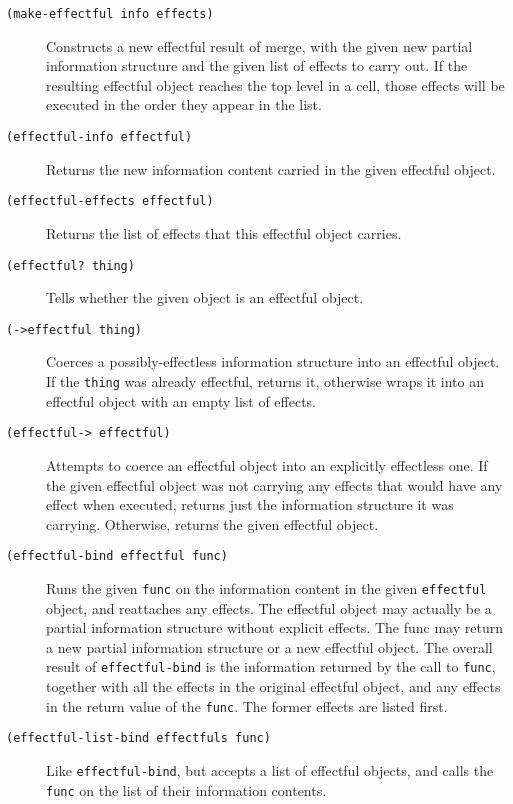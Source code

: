 \documentclass[12pt,letterpaper,english]{article}
\begin{document}
\begin{description}
\item[{\texttt{(make-effectful info effects)}}] \leavevmode 
Constructs a new effectful result of merge, with the given new
partial information structure and the given list of effects to carry
out.  If the resulting effectful object reaches the top level in a
cell, those effects will be executed in the order they appear in the
list.

\item[{\texttt{(effectful-info effectful)}}] \leavevmode 
Returns the new information content carried in the given
effectful object.

\item[{\texttt{(effectful-effects effectful)}}] \leavevmode 
Returns the list of effects that this effectful object carries.

\item[{\texttt{(effectful? thing)}}] \leavevmode 
Tells whether the given object is an effectful object.

\item[{\texttt{(->effectful thing)}}] \leavevmode 
Coerces a possibly-effectless information structure into an
effectful object.  If the \texttt{thing} was already effectful,
returns it, otherwise wraps it into an effectful object
with an empty list of effects.

\item[{\texttt{(effectful-> effectful)}}] \leavevmode 
Attempts to coerce an effectful object into an explicitly effectless
one.  If the given effectful object was not carrying any effects
that would have any effect when executed, returns just the
information structure it was carrying.  Otherwise, returns
the given effectful object.

\item[{\texttt{(effectful-bind effectful func)}}] \leavevmode 
Runs the given \texttt{func} on the information content in the given
\texttt{effectful} object, and reattaches any effects.  The effectful
object may actually be a partial information structure without
explicit effects.  The func may return a new partial information
structure or a new effectful object.  The overall result of
\texttt{effectful-bind} is the information returned by the call to
\texttt{func}, together with all the effects in the original effectful
object, and any effects in the return value of the \texttt{func}.  The
former effects are listed first.

\item[{\texttt{(effectful-list-bind effectfuls func)}}] \leavevmode 
Like \texttt{effectful-bind}, but accepts a list of effectful objects,
and calls the \texttt{func} on the list of their information contents.

\end{description}
\end{document}
